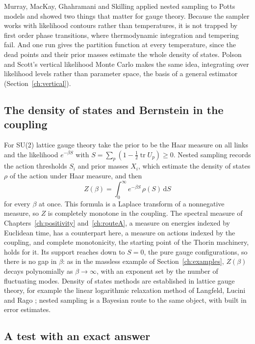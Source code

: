 Murray, MacKay, Ghahramani and Skilling applied nested sampling to Potts models and showed two things that matter for gauge theory. Because the sampler works with likelihood contours rather than temperatures, it is not trapped by first order phase transitions, where thermodynamic integration and tempering fail. And one run gives the partition function at every temperature, since the dead points and their prior masses estimate the whole density of states. Polson and Scott's vertical likelihood Monte Carlo \cite{PSvl} makes the same idea, integrating over likelihood levels rather than parameter space, the basis of a general estimator (Section~\ref{ch:vertical}).

\subsection{The density of states and Bernstein in the coupling}

For SU(2) lattice gauge theory take the prior to be the Haar measure on all links and the likelihood $e^{-\beta S}$ with $S=\sum_p(1-\frac12\operatorname{tr}U_p)\ge0$. Nested sampling records the action thresholds $S_i$ and prior masses $X_i$, which estimate the density of states $\rho$ of the action under Haar measure, and then
\[
Z(\beta)=\int_0^\infty e^{-\beta S}\,\rho(S)\,\mathrm dS
\]
for every $\beta$ at once. This formula is a Laplace transform of a nonnegative measure, so $Z$ is completely monotone in the coupling. The spectral measure of Chapters~\ref{ch:positivity} and~\ref{ch:routeA}, a measure on energies indexed by Euclidean time, has a counterpart here, a measure on actions indexed by the coupling, and complete monotonicity, the starting point of the Thorin machinery, holds for it. Its support reaches down to $S=0$, the pure gauge configurations, so there is no gap in $\beta$: as in the massless example of Section~\ref{ch:examples}, $Z(\beta)$ decays polynomially as $\beta\to\infty$, with an exponent set by the number of fluctuating modes. Density of states methods are established in lattice gauge theory, for example the linear logarithmic relaxation method of Langfeld, Lucini and Rago \cite{LLR}; nested sampling is a Bayesian route to the same object, with built in error estimates.

\subsection{A test with an exact answer}

